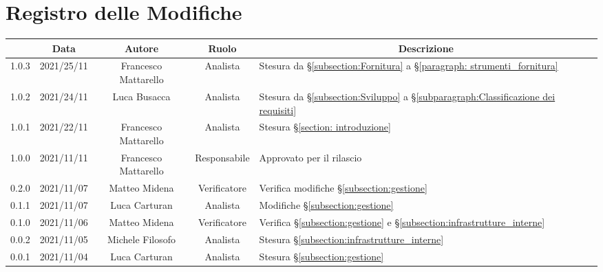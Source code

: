 \thispagestyle{empty}
\section*{Registro delle Modifiche}

\begin{center}
	\renewcommand{\arraystretch}{1.8}
	\begin{longtable}[c]{c | c | c | c | p{5cm}}
		\rowcolor[HTML]{125E28}
		\multicolumn{1}{c}{\color[HTML]{FFFFFF} \textbf{Versione}} & 
		\multicolumn{1}{c}{\color[HTML]{FFFFFF} \textbf{Data}} & 
		\multicolumn{1}{c}{\color[HTML]{FFFFFF} \textbf{Autore}} & 
		\multicolumn{1}{c}{\color[HTML]{FFFFFF} \textbf{Ruolo}} & 
		\multicolumn{1}{c}{\color[HTML]{FFFFFF} \textbf{Descrizione}} \\
		\endhead
		1.0.3 & 2021/25/11 & Francesco Mattarello & Analista & Stesura da §\ref{subsection:Fornitura} a §\ref{paragraph: strumenti_fornitura} \\
		1.0.2 & 2021/24/11 & Luca Busacca & Analista & Stesura da §\ref{subsection:Sviluppo} a  §\ref{subparagraph:Classificazione dei requisiti} \\
		1.0.1 & 2021/22/11 & Francesco Mattarello & Analista & Stesura §\ref{section: introduzione}\\
		1.0.0 & 2021/11/11 & Francesco Mattarello & Responsabile & Approvato per il rilascio\\
		0.2.0 & 2021/11/07 & Matteo Midena & Verificatore & Verifica modifiche §\ref{subsection:gestione}\\
		0.1.1 & 2021/11/07 & Luca Carturan & Analista & Modifiche §\ref{subsection:gestione}\\
		0.1.0 & 2021/11/06 & Matteo Midena & Verificatore & Verifica  §\ref{subsection:gestione} e  §\ref{subsection:infrastrutture_interne}\\
		0.0.2 & 2021/11/05 & Michele Filosofo & Analista & Stesura §\ref{subsection:infrastrutture_interne}\\
		0.0.1 & 2021/11/04 & Luca Carturan & Analista &Stesura §\ref{subsection:gestione}  \\

	\end{longtable}
\end{center}